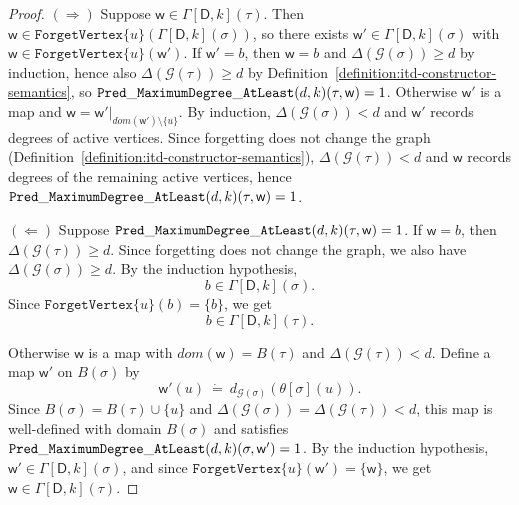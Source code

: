 \documentclass[11pt,a4paper]{article}
\newcommand{\truevalue}{1}
\newcommand{\treewidthvalue}{k}
\newcommand{\decompositiongraph}[1]{\mathcal{G}(#1)}
\newcommand{\maxDegree}{\Delta}
\newcommand{\forgetvertextype}[1]{\mathtt{ForgetVertex}\{#1\}}
\newcommand{\topbagname}{B}
\newcommand{\topbag}[1]{\topbagname(#1)}
\newcommand{\abstractdecomposition}{\tau}
\newcommand{\sigmaabstractdecomposition}{\sigma}
\newcommand{\defeq}{~\dot{=}~}
\newcommand{\vertexone}{u}
\newcommand{\awitness}{\mathsf{w}}
\newcommand{\dpcore}{\mathsf{D}}
\newcommand{\dpNamePart}[1]{\mbox{\normalfont\ttfamily #1}}
\newcommand{\predicateMaxDegree}[2]{\dpNamePart{Pred}\_\allowbreak\dpNamePart{MaximumDegree}\_\allowbreak\dpNamePart{AtLeast}(#1,#2)}
\newcommand{\topmapname}{\theta}
\newcommand{\topmap}[1]{\topmapname[#1]}
\newcommand{\dynamizationfunctionname}[1]{\Gamma[{#1}]}
\newcommand{\dynamizationfunction}[2]{\dynamizationfunctionname{#1,#2}}
\newcommand{\domain}{dom}
\newcommand{\maxdegreeparameter}{d}
\newcommand{\maxdegreefound}{b}
\newcommand{\mxdp}{\predicateMaxDegree{\maxdegreeparameter}{\treewidthvalue}}
\begin{document}
{\begin{proof}
$(\Rightarrow)$ Suppose $\awitness\in \dynamizationfunction{\dpcore}{\treewidthvalue}\allowbreak(\abstractdecomposition)$. Then $\awitness\in \forgetvertextype{\vertexone}(\dynamizationfunction{\dpcore}{\treewidthvalue}\allowbreak(\sigmaabstractdecomposition))$, so there exists $\awitness'\in \dynamizationfunction{\dpcore}{\treewidthvalue}\allowbreak(\sigmaabstractdecomposition)$ with $\awitness\in \forgetvertextype{\vertexone}(\awitness')$. If $\awitness'=\maxdegreefound$, then $\awitness=\maxdegreefound$ and $\maxDegree(\decompositiongraph{\sigmaabstractdecomposition})\ge \maxdegreeparameter$ by induction, hence also $\maxDegree(\decompositiongraph{\abstractdecomposition})\ge \maxdegreeparameter$ by Definition~\ref{definition:itd-constructor-semantics}, so $\mxdp(\abstractdecomposition,\awitness)=\truevalue$. Otherwise $\awitness'$ is a map and $\awitness=\awitness'|_{\domain(\awitness')\setminus\{\vertexone\}}$. By induction, $\maxDegree(\decompositiongraph{\sigmaabstractdecomposition})<\maxdegreeparameter$ and $\awitness'$ records degrees of active vertices. Since forgetting does not change the graph (Definition~\ref{definition:itd-constructor-semantics}), $\maxDegree(\decompositiongraph{\abstractdecomposition})<\maxdegreeparameter$ and $\awitness$ records degrees of the remaining active vertices, hence $\mxdp(\abstractdecomposition,\awitness)=\truevalue$.

$(\Leftarrow)$ Suppose $\mxdp(\abstractdecomposition,\awitness)=\truevalue$.
If $\awitness=\maxdegreefound$, then $\maxDegree(\decompositiongraph{\abstractdecomposition})\ge \maxdegreeparameter$.
Since forgetting does not change the graph, we also have $\maxDegree(\decompositiongraph{\sigmaabstractdecomposition})\ge \maxdegreeparameter$.
By the induction hypothesis,
\[
\maxdegreefound\in \dynamizationfunction{\dpcore}{\treewidthvalue}(\sigmaabstractdecomposition).
\]
Since $\forgetvertextype{\vertexone}(\maxdegreefound)=\{\maxdegreefound\}$, we get
\[
\maxdegreefound\in \dynamizationfunction{\dpcore}{\treewidthvalue}(\abstractdecomposition).
\]

Otherwise $\awitness$ is a map with $\domain(\awitness)=\topbag{\abstractdecomposition}$ and $\maxDegree(\decompositiongraph{\abstractdecomposition})<\maxdegreeparameter$.
Define a map $\awitness'$ on $\topbag{\sigmaabstractdecomposition}$ by
\[
\awitness'(u)\defeq d_{\decompositiongraph{\sigmaabstractdecomposition}}(\topmap{\sigmaabstractdecomposition}(u)).
\]
Since $\topbag{\sigmaabstractdecomposition}=\topbag{\abstractdecomposition}\cup\{\vertexone\}$ and $\maxDegree(\decompositiongraph{\sigmaabstractdecomposition})=\maxDegree(\decompositiongraph{\abstractdecomposition})<\maxdegreeparameter$, this map is well-defined with domain $\topbag{\sigmaabstractdecomposition}$ and satisfies $\mxdp(\sigmaabstractdecomposition,\awitness')=\truevalue$.
By the induction hypothesis, $\awitness'\in \dynamizationfunction{\dpcore}{\treewidthvalue}(\sigmaabstractdecomposition)$, and since $\forgetvertextype{\vertexone}(\awitness')=\{\awitness\}$, we get $\awitness\in \dynamizationfunction{\dpcore}{\treewidthvalue}(\abstractdecomposition)$.


\end{proof}}
\end{document}
